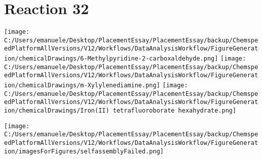 \documentclass{article}%
\begin{document}
\section*{Reaction 32}%
%
\begin{scheme}[H]%
\begin{minipage}{0.5\textwidth}%
\texttt{[image: C:/Users/emanuele/Desktop/PlacementEssay/PlacementEssay/backup/ChemspeedPlatformAllVersions/V12/Workflows/DataAnalysisWorkflow/FigureGeneration/chemicalDrawings/6-Methylpyridine-2-carboxaldehyde.png]}%
\texttt{[image: C:/Users/emanuele/Desktop/PlacementEssay/PlacementEssay/backup/ChemspeedPlatformAllVersions/V12/Workflows/DataAnalysisWorkflow/FigureGeneration/chemicalDrawings/m-Xylylenediamine.png]}%
\texttt{[image: C:/Users/emanuele/Desktop/PlacementEssay/PlacementEssay/backup/ChemspeedPlatformAllVersions/V12/Workflows/DataAnalysisWorkflow/FigureGeneration/chemicalDrawings/Iron(II) tetrafluoroborate hexahydrate.png]}%
\end{minipage}%
\begin{minipage}{0.5\textwidth}%
\begin{center}%
\texttt{[image: C:/Users/emanuele/Desktop/PlacementEssay/PlacementEssay/backup/ChemspeedPlatformAllVersions/V12/Workflows/DataAnalysisWorkflow/FigureGeneration/imagesForFigures/selfassemblyFailed.png]}%
\end{center}%
\end{minipage}%
\caption{Self-assembly of components 8, 18, with Iron(II) in a 3.0:1.5:1.0 molar ratio in CH$_3$CN at 60\textdegree C for 40h. These are the reagents (starting materials) for reaction 32.}%
\end{scheme}%
\end{document}
